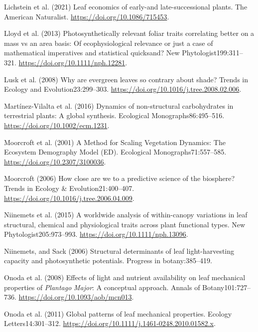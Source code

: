 \documentclass[
  12pt,
  letterpaper,
  DIV=11,
  numbers=noendperiod]{scrartcl}
\newlength{\cslhangindent}
\newenvironment{CSLReferences}[2] %
 {\begin{list}{}{%
  \setlength{\itemindent}{0pt}
  \setlength{\leftmargin}{0pt}
  \setlength{\parsep}{0pt}
  \ifodd #1
   \setlength{\leftmargin}{\cslhangindent}
   \setlength{\itemindent}{-1\cslhangindent}
  \fi
  \setlength{\itemsep}{#2\baselineskip}}}
 {\end{list}}
\begin{document}
\begin{CSLReferences}{1}{1}
Lichstein et al. (2021) Leaf economics of early-and late-successional
plants. The American Naturalist. \url{https://doi.org/10.1086/715453}.

Lloyd et al. (2013) Photosynthetically relevant foliar traits
correlating better on a mass vs an area basis: {Of} ecophysiological
relevance or just a case of mathematical imperatives and statistical
quicksand? New Phytologist199:311--321.
\url{https://doi.org/10.1111/nph.12281}.

Lusk et al. (2008) Why are evergreen leaves so contrary about shade?
Trends in Ecology and Evolution23:299--303.
\url{https://doi.org/10.1016/j.tree.2008.02.006}.

Martínez-Vilalta et al. (2016) Dynamics of non-structural carbohydrates
in terrestrial plants: A global synthesis. Ecological
Monographs86:495--516. \url{https://doi.org/10.1002/ecm.1231}.

Moorcroft et al. (2001) A {Method} for {Scaling Vegetation Dynamics}:
{The Ecosystem Demography Model} ({ED}). Ecological
Monographs71:557--585. \url{https://doi.org/10.2307/3100036}.

Moorcroft (2006) How close are we to a predictive science of the
biosphere? Trends in Ecology \& Evolution21:400--407.
\url{https://doi.org/10.1016/j.tree.2006.04.009}.

Niinemets et al. (2015) A worldwide analysis of within-canopy variations
in leaf structural, chemical and physiological traits across plant
functional types. New Phytologist205:973--993.
\url{https://doi.org/10.1111/nph.13096}.

Niinemets, and Sack (2006) Structural determinants of leaf
light-harvesting capacity and photosynthetic potentials. Progress in
botany:385--419.

Onoda et al. (2008) Effects of light and nutrient availability on leaf
mechanical properties of {\emph{Plantago}}{ \emph{Major}}: {A}
conceptual approach. Annals of Botany101:727--736.
\url{https://doi.org/10.1093/aob/mcn013}.

Onoda et al. (2011) Global patterns of leaf mechanical properties.
Ecology Letters14:301--312.
\url{https://doi.org/10.1111/j.1461-0248.2010.01582.x}.


\end{CSLReferences}
\end{document}
